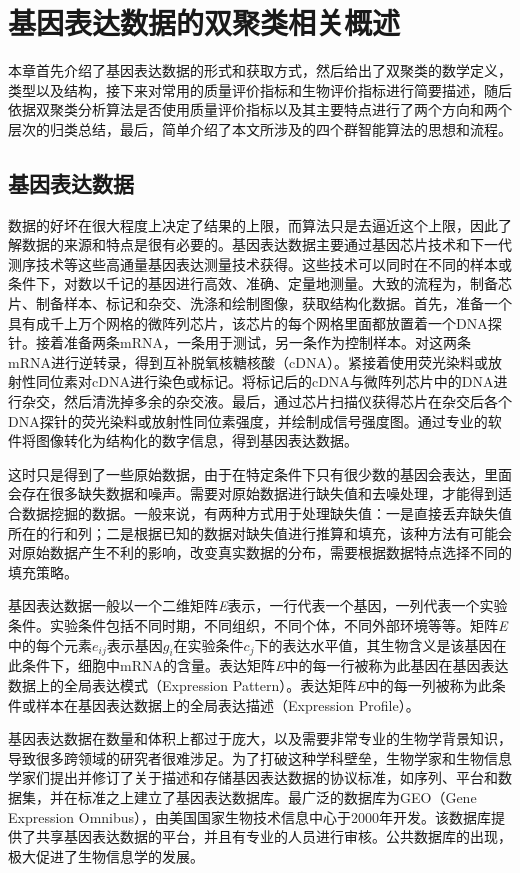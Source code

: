\chapter{基因表达数据的双聚类相关概述}
本章首先介绍了基因表达数据的形式和获取方式，然后给出了双聚类的数学定义，类型以及结构，接下来对常用的质量评价指标和生物评价指标进行简要描述，随后依据双聚类分析算法是否使用质量评价指标以及其主要特点进行了两个方向和两个层次的归类总结，最后，简单介绍了本文所涉及的四个群智能算法的思想和流程。

\section{基因表达数据}
  数据的好坏在很大程度上决定了结果的上限，而算法只是去逼近这个上限，因此了解数据的来源和特点是很有必要的。基因表达数据主要通过基因芯片技术和下一代测序技术等这些高通量基因表达测量技术获得。这些技术可以同时在不同的样本或条件下，对数以千记的基因进行高效、准确、定量地测量。大致的流程为，制备芯片、制备样本、标记和杂交、洗涤和绘制图像，获取结构化数据。首先，准备一个具有成千上万个网格的微阵列芯片，该芯片的每个网格里面都放置着一个DNA探针。接着准备两条mRNA，一条用于测试，另一条作为控制样本。对这两条mRNA进行逆转录，得到互补脱氧核糖核酸（cDNA）。紧接着使用荧光染料或放射性同位素对cDNA进行染色或标记。将标记后的cDNA与微阵列芯片中的DNA进行杂交，然后清洗掉多余的杂交液。最后，通过芯片扫描仪获得芯片在杂交后各个DNA探针的荧光染料或放射性同位素强度，并绘制成信号强度图。通过专业的软件将图像转化为结构化的数字信息，得到基因表达数据。
  
  这时只是得到了一些原始数据，由于在特定条件下只有很少数的基因会表达，里面会存在很多缺失数据和噪声。需要对原始数据进行缺失值和去噪处理，才能得到适合数据挖掘的数据。一般来说，有两种方式用于处理缺失值：一是直接丢弃缺失值所在的行和列；二是根据已知的数据对缺失值进行推算和填充，该种方法有可能会对原始数据产生不利的影响，改变真实数据的分布，需要根据数据特点选择不同的填充策略。

  基因表达数据一般以一个二维矩阵\textit{E}表示，一行代表一个基因，一列代表一个实验条件。实验条件包括不同时期，不同组织，不同个体，不同外部环境等等。矩阵\textit{E}中的每个元素$e_{ij} $表示基因$g_i$在实验条件$c_j$下的表达水平值，其生物含义是该基因在此条件下，细胞中mRNA的含量。表达矩阵\textit{E}中的每一行被称为此基因在基因表达数据上的全局表达模式（Expression Pattern）。表达矩阵\textit{E}中的每一列被称为此条件或样本在基因表达数据上的全局表达描述（Expression Profile）。

  基因表达数据在数量和体积上都过于庞大，以及需要非常专业的生物学背景知识，导致很多跨领域的研究者很难涉足。为了打破这种学科壁垒，生物学家和生物信息学家们提出并修订了关于描述和存储基因表达数据的协议标准，如序列、平台和数据集，并在标准之上建立了基因表达数据库。最广泛的数据库为GEO（Gene Expression Omnibus），由美国国家生物技术信息中心于2000年开发。该数据库提供了共享基因表达数据的平台，并且有专业的人员进行审核。公共数据库的出现，极大促进了生物信息学的发展。
